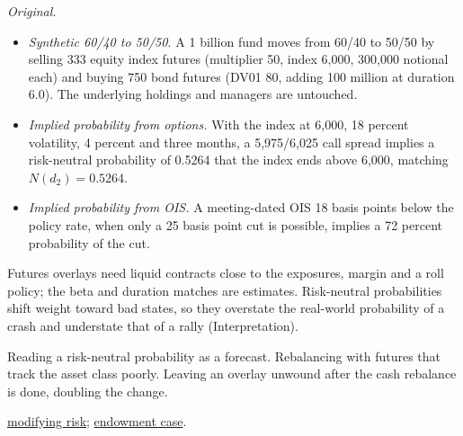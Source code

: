\begin{qfmethod}
 \emph{Original.}
\begin{itemize}
\item \emph{Synthetic 60/40 to 50/50.} A 1 billion fund moves from 60/40 to 50/50 by selling 333 equity index futures (multiplier 50, index 6{,}000, 300{,}000 notional each) and buying 750 bond futures (DV01 80, adding 100 million at duration 6.0). The underlying holdings and managers are untouched.
\item \emph{Implied probability from options.} With the index at 6{,}000, 18 percent volatility, 4 percent and three months, a 5{,}975/6{,}025 call spread implies a risk-neutral probability of 0.5264 that the index ends above 6{,}000, matching $N(d_2)=0.5264$.
\item \emph{Implied probability from OIS.} A meeting-dated OIS 18 basis points below the policy rate, when only a 25 basis point cut is possible, implies a 72 percent probability of the cut.
\end{itemize}

 Futures overlays need liquid contracts close to the exposures, margin and a roll policy; the beta and duration matches are estimates. Risk-neutral probabilities shift weight toward bad states, so they overstate the real-world probability of a crash and understate that of a rally (Interpretation).

 Reading a risk-neutral probability as a forecast. Rebalancing with futures that track the asset class poorly. Leaving an overlay unwound after the cash rebalance is done, doubling the change.

 \hyperref[meth:forward-commitment-risk-overlays]{modifying risk}; \hyperref[ex:endowment-derivative-overlay-case]{endowment case}.

\end{qfmethod}

